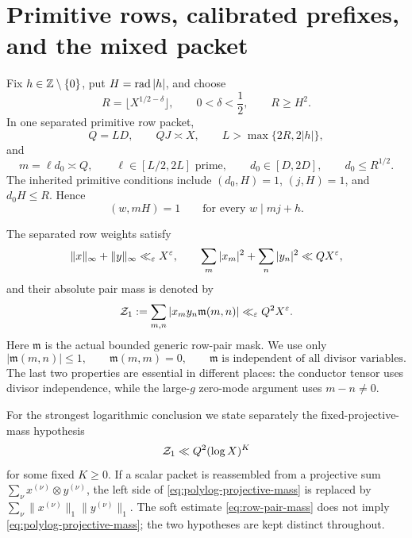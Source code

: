 \section{Primitive rows, calibrated prefixes, and the mixed packet}
\label{sec:interface-prefixes}

Fix \(h\in\mathbb Z\setminus\{0\}\), put \(H=\operatorname{rad}|h|\), and choose
\begin{equation}
 R=\lfloor X^{1/2-\delta}\rfloor,\qquad
 0<\delta<\frac12,\qquad R\ge H^2.
 \label{eq:R-def}
\end{equation}
In one separated primitive row packet,
\begin{equation}
 Q=LD,\qquad QJ\asymp X,\qquad
 L>\max\{2R,2|h|\},
 \label{eq:row-scales}
\end{equation}
and
\begin{equation}
 m=\ell d_0\asymp Q,\qquad
 \ell\in[L/2,2L]\text{ prime},\qquad
 d_0\in[D,2D],\qquad d_0\le R^{1/2}.
 \label{eq:row-support}
\end{equation}
The inherited primitive conditions include
\((d_0,H)=1\), \((j,H)=1\), and \(d_0H\le R\).  Hence
\begin{equation}
 (w,mH)=1
 \qquad\text{for every }w\mid mj+h.
 \label{eq:target-primitivity}
\end{equation}

The separated row weights satisfy
\begin{equation}
 \|x\|_\infty+\|y\|_\infty\ll_\varepsilon X^\varepsilon,\qquad
 \sum_m|x_m|^2+\sum_n|y_n|^2\ll QX^\varepsilon,
 \label{eq:row-energy}
\end{equation}
and their absolute pair mass is denoted by
\begin{equation}
 \mathcal Z_1:=\sum_{m,n}|x_my_n\mathfrak m(m,n)|
 \ll_\varepsilon Q^2X^\varepsilon.
 \label{eq:row-pair-mass}
\end{equation}
Here \(\mathfrak m\) is the actual bounded generic row-pair mask.  We
use only
\begin{equation}
 |\mathfrak m(m,n)|\le1,\qquad
 \mathfrak m(m,m)=0,\qquad
 \mathfrak m\text{ is independent of all divisor variables}.
 \label{eq:mask}
\end{equation}
The last two properties are essential in different places: the
conductor tensor uses divisor independence, while the large-\(g\)
zero-mode argument uses \(m-n\ne0\).

For the strongest logarithmic conclusion we state separately the
fixed-projective-mass hypothesis
\begin{equation}
 \mathcal Z_1\ll Q^2(\log X)^K
 \label{eq:polylog-projective-mass}
\end{equation}
for some fixed \(K\ge0\).  If a scalar packet is reassembled from a
projective sum \(\sum_\nu x^{(\nu)}\otimes y^{(\nu)}\), the left side
of \eqref{eq:polylog-projective-mass} is replaced by
\(\sum_\nu\|x^{(\nu)}\|_1\|y^{(\nu)}\|_1\).  The soft estimate
\eqref{eq:row-pair-mass} does not imply
\eqref{eq:polylog-projective-mass}; the two hypotheses are kept
distinct throughout.

